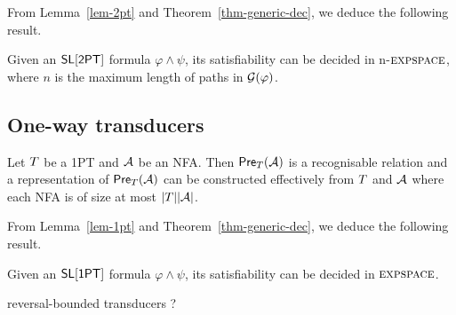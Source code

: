 From Lemma~\ref{lem-2pt} and Theorem~\ref{thm-generic-dec}, we deduce the following result.
%
\begin{corollary}
Given an $\textsf{SL}[\textsf{2PT}]$ formula $\varphi \wedge \psi$, its satisfiability can be decided in n-$\textsc{expspace}$, where $n$ is the maximum length of paths in $\mathcal{G}(\varphi)$. 
\end{corollary}


\subsection{One-way transducers}


\begin{lemma}\label{lem-1pt}
Let $T$ be a 1PT and $\mathcal{A}$ be an NFA. Then $\textsf{Pre}_{T}(\mathcal{A})$ is a recognisable relation and a representation of $\textsf{Pre}_{T}(\mathcal{A})$ can be constructed effectively from $T$ and $\mathcal{A}$ where each NFA is of size at most $|T||\mathcal{A}|$.
\end{lemma}

From Lemma~\ref{lem-1pt} and Theorem~\ref{thm-generic-dec}, we deduce the following result.
%
\begin{corollary}
Given an $\textsf{SL}[\textsf{1PT}]$ formula $\varphi \wedge \psi$, its satisfiability can be decided in $\textsc{expspace}$. 
\end{corollary}

reversal-bounded transducers ?

